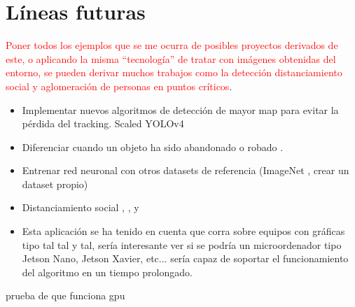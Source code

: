 \newpage

\section{Líneas futuras}
\label{sec:lineas-futuras}

\textcolor{red}{Poner todos los ejemplos que se me ocurra de posibles proyectos derivados de este, o aplicando la misma ``tecnología'' de tratar con imágenes obtenidas del entorno, se pueden derivar muchos trabajos como la detección distanciamiento social y aglomeración de personas en puntos críticos}.

\begin{itemize}
    \item Implementar nuevos algoritmos de detección de mayor \gls{map} para evitar la pérdida del tracking. Scaled YOLOv4 \cite{wang2021scaledyolov4}
    \item Diferenciar cuando un objeto ha sido abandonado o robado \cite{9079525}.
    \item Entrenar red neuronal con otros datasets de referencia (ImageNet \cite{russakovsky2015imagenet}, crear un dataset propio)
    \item Distanciamiento social \cite{punn2020monitoring}, \cite{Rezaei_2020}, \cite{Gupta_2020} y \cite{fan2020autonomous}
    \item Esta aplicación se ha tenido en cuenta que corra sobre equipos con gráficas tipo tal tal y tal, sería interesante ver si se podría un microordenador tipo Jetson Nano, Jetson Xavier, etc... sería capaz de soportar el funcionamiento del algoritmo en un tiempo prolongado.
\end{itemize}

prueba de que funciona \gls{gpu}